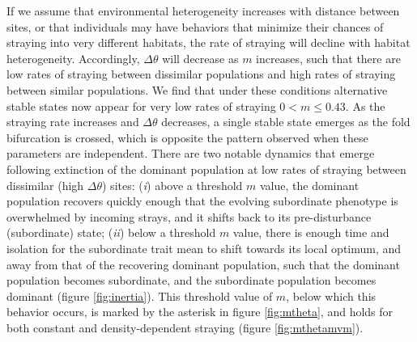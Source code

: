 \documentclass[twocolumn,preprintnumbers,amsmath,amssymb,superscriptaddress]{revtex4}
\begin{document}
If we assume that environmental heterogeneity increases with distance between sites, or that individuals may have behaviors that minimize their chances of straying into very different habitats, the rate of straying will decline with habitat heterogeneity.
Accordingly, $\Delta\theta$ will decrease as $m$ increases, such that there are low rates of straying between dissimilar populations and high rates of straying between similar populations.
We find that under these conditions alternative stable states now appear for very low rates of straying $0 < m \leq 0.43$.
As the straying rate increases and $\Delta\theta$ decreases, a single stable state emerges as the fold bifurcation is crossed, which is opposite the pattern observed when these parameters are independent.
There are two notable dynamics that emerge following extinction of the dominant population at low rates of straying between dissimilar (high $\Delta\theta$) sites:
(\emph{i}) above a threshold $m$ value, the dominant population recovers quickly enough that the evolving subordinate phenotype is overwhelmed by incoming strays, and it shifts back to its pre-disturbance (subordinate) state;
(\emph{ii}) below a threshold $m$ value, there is enough time and isolation for the subordinate trait mean to shift towards its local optimum, and away from that of the recovering dominant population, such that the dominant population becomes subordinate, and the subordinate population becomes dominant (figure \ref{fig:inertia}).
This threshold value of $m$, below which this behavior occurs, is marked by the asterisk in figure \ref{fig:mtheta}, and holds for both constant and density-dependent straying (figure \ref{fig:mthetamvm}).
\end{document}
